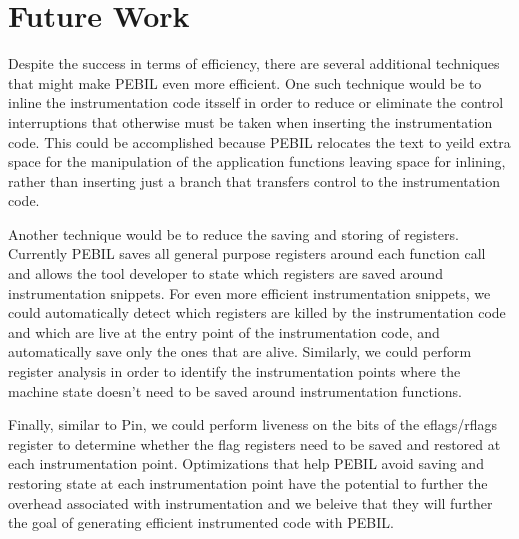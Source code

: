\section{Future Work}
\label{sec:Future}

Despite the success in terms of efficiency, there are several additional
techniques that might make PEBIL even more efficient. One such technique would be
to inline the instrumentation code itsself in order to reduce or eliminate the
control interruptions  that otherwise must be taken when inserting the
instrumentation code. This could be accomplished because PEBIL relocates the
text to yeild extra space for the manipulation of the application functions
leaving space for inlining, rather than inserting just a branch that transfers
control to the instrumentation code. 

Another technique would be to reduce the saving and storing of registers.
Currently PEBIL saves all general purpose registers around each function call
and allows the tool developer to state which registers are saved around
instrumentation snippets. For even more efficient instrumentation snippets, we
could automatically detect which registers are killed by the instrumentation
code and which are live at the entry point of the instrumentation code, and
automatically save only the ones that are alive. Similarly, we could perform
register analysis in order to identify the instrumentation points where the
machine state doesn't need to be saved around instrumentation functions. 

Finally, similar to Pin, we could perform liveness on the bits of the
eflags/rflags register to determine whether the flag registers need to be saved
and restored at each instrumentation point. Optimizations that help PEBIL avoid
saving and restoring state at each instrumentation point have the potential to
further the overhead associated with instrumentation and we beleive that they
will further the goal of generating efficient instrumented code with PEBIL.


